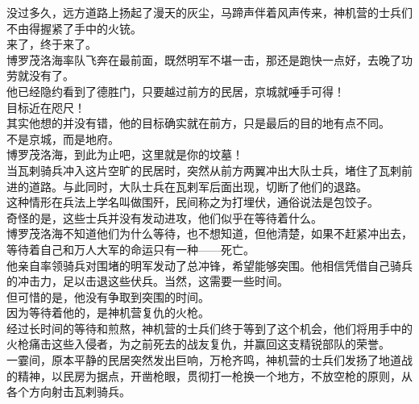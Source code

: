 \begin{multicols}{\theparacolNo}
没过多久，远方道路上扬起了漫天的灰尘，马蹄声伴着风声传来，神机营的士兵们不由得握紧了手中的火铳。\\

来了，终于来了。\\

博罗茂洛海率队飞奔在最前面，既然明军不堪一击，那还是跑快一点好，去晚了功劳就没有了。\\

他已经隐约看到了德胜门，只要越过前方的民居，京城就唾手可得！\\

目标近在咫尺！\\

其实他想的并没有错，他的目标确实就在前方，只是最后的目的地有点不同。\\

不是京城，而是地府。\\

博罗茂洛海，到此为止吧，这里就是你的坟墓！\\

当瓦剌骑兵冲入这片空旷的民居时，突然从前方两翼冲出大队士兵，堵住了瓦剌前进的道路。与此同时，大队士兵在瓦剌军后面出现，切断了他们的退路。\\

这种情形在兵法上学名叫做围歼，民间称之为打埋伏，通俗说法是包饺子。\\

奇怪的是，这些士兵并没有发动进攻，他们似乎在等待着什么。\\

博罗茂洛海不知道他们为什么等待，也不想知道，但他清楚，如果不赶紧冲出去，等待着自己和万人大军的命运只有一种——死亡。\\

他亲自率领骑兵对围堵的明军发动了总冲锋，希望能够突围。他相信凭借自己骑兵的冲击力，足以击退这些伏兵。当然，这需要一些时间。\\

但可惜的是，他没有争取到突围的时间。\\

因为等待着他的，是神机营复仇的火枪。\\

经过长时间的等待和煎熬，神机营的士兵们终于等到了这个机会，他们将用手中的火枪痛击这些入侵者，为之前死去的战友复仇，并赢回这支精锐部队的荣誉。\\

一霎间，原本平静的民居突然发出巨响，万枪齐鸣，神机营的士兵们发扬了地道战的精神，以民房为据点，开凿枪眼，贯彻打一枪换一个地方，不放空枪的原则，从各个方向射击瓦剌骑兵。\\


\end{multicols}
